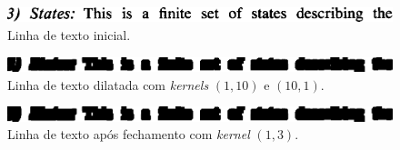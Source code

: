 \documentclass[twocolumn, 10pt]{article}
\begin{document}
\begin{figure}[htbp]
\centering
\includegraphics[width=.9\linewidth]{./img/line1.png}
\caption{Linha de texto inicial.}
\end{figure}

\begin{figure}[htbp]
\centering
\includegraphics[width=.9\linewidth]{./img/line3.png}
\caption{Linha de texto dilatada com \emph{kernels} \((1,10)\) e \((10,1)\).}
\end{figure}

\begin{figure}[htbp]
\centering
\includegraphics[width=.9\linewidth]{./img/line4.png}
\caption{Linha de texto após fechamento com \emph{kernel} \((1,3)\).}
\end{figure}
\end{document}

